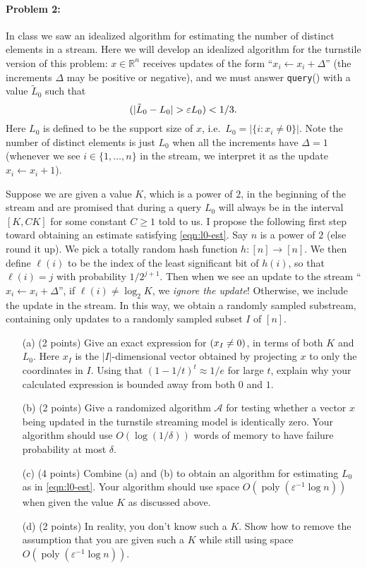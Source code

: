 \documentclass[12pt]{article}
\let\Pr\relax
\DeclareMathOperator*{\Pr}{\mathbb{P}}
\begin{document}
\paragraph{Problem 2:} In class we saw an idealized algorithm for estimating the number of distinct elements in a stream. Here we will develop an idealized algorithm for the turnstile version of this problem: $x\in\mathbb{R}^n$ receives updates of the form ``$x_i\leftarrow x_i + \Delta$'' (the increments $\Delta$ may be positive or negative), and we must answer \texttt{query}() with a value $\tilde{L}_0$ such that
\begin{equation}
\Pr(|\tilde{L}_0 - L_0| > \varepsilon L_0) < 1/3 .\label{eqn:l0-est}
\end{equation}
Here $L_0$ is defined to be the support size of $x$, i.e.\ $L_0 = |\{i : x_i\neq 0\}|$. Note the number of distinct elements is just $L_0$ when all the increments have $\Delta = 1$ (whenever we see $i\in\{1,\ldots,n\}$ in the stream, we interpret it as the update $x_i \leftarrow x_i + 1$).

Suppose we are given a value $K$, which is a power of $2$, in the beginning of the stream and are promised that during a query $L_0$ will always be in the interval $[K, C K]$ for some constant $C\ge 1$ told to us. I propose the following first step toward obtaining an estimate satisfying \eqref{eqn:l0-est}. Say $n$ is a power of $2$ (else round it up). We pick a totally random hash function $h:[n]\rightarrow[n]$. We then define $\ell(i)$ to be the index of the least significant bit of $h(i)$, so that $\ell(i) = j$ with probability $1/2^{j+1}$. Then when we see an update to the stream ``$x_i\leftarrow x_i + \Delta$'', if $\ell(i) \neq \log_2 K$, we {\em ignore the update}! Otherwise, we include the update in the stream. In this way, we obtain a randomly sampled substream, containing only updates to a randomly sampled subset $I$ of $[n]$.

\begin{itemize}
\item[(a)] (2 points) Give an exact expression for $\Pr(x_I\neq 0)$, in terms of both $K$ and $L_0$. Here $x_I$ is the $|I|$-dimensional vector obtained by projecting $x$ to only the coordinates in $I$. Using that $(1 - 1/t)^t \approx 1/e$ for large $t$, explain why your calculated expression is bounded away from both $0$ and $1$.
\item[(b)] (2 points) Give a randomized algorithm $\mathcal{A}$ for testing whether a vector $x$ being updated in the turnstile streaming model is identically zero. Your algorithm should use $O(\log(1/\delta))$ words of memory to have failure probability at most $\delta$.
\item[(c)] (4 points)  Combine (a) and (b) to obtain an algorithm for estimating $L_0$ as in \eqref{eqn:l0-est}. Your algorithm should use space $O(\mathop{poly}(\varepsilon^{-1}\log n))$ when given the value $K$ as discussed above.
\item[(d)] (2 points) In reality, you don't know such a $K$. Show how to remove the assumption that you are given such a $K$ while still using space $O(\mathop{poly}(\varepsilon^{-1}\log n))$.
\end{itemize}
\end{document}
